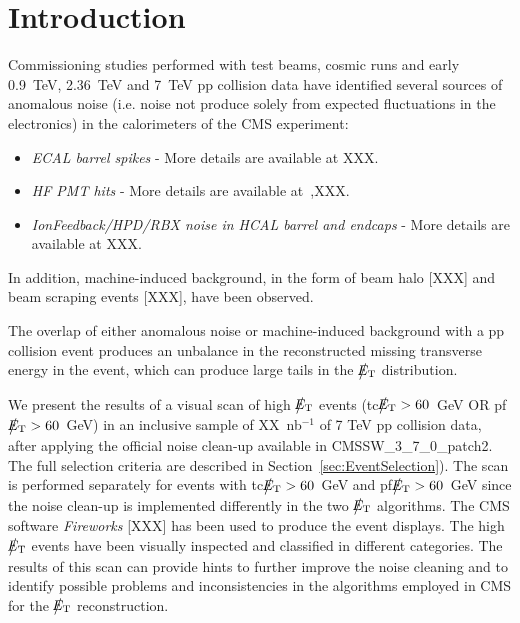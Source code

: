 \section{Introduction}

Commissioning studies performed with test beams, cosmic runs and 
early 0.9~TeV, 2.36~TeV and 7~TeV pp 
collision data have identified several sources of anomalous noise 
(i.e. noise not produce solely from expected fluctuations in the electronics)
in the calorimeters of the CMS experiment:
\begin{itemize}
\item {\it ECAL barrel spikes} - More details are available at XXX.

\item {\it HF PMT hits} - More details are available at~\cite{Chatrchyan:1225105},XXX.

\item {\it IonFeedback/HPD/RBX noise in HCAL barrel and endcaps} - More details are available at XXX.
\end{itemize}
In addition, machine-induced background, in the form of 
beam halo [XXX] and beam scraping events [XXX], have been observed. 

The overlap of either anomalous noise or machine-induced background 
with a pp collision event produces an unbalance in 
the reconstructed missing transverse energy in the event, which can produce 
large tails in the $\big\slash\hspace{-1.6ex}{E_\text{T}}$ distribution. 

We present the results of a visual scan of high $\big\slash\hspace{-1.6ex}{E_\text{T}}$ events 
(tc$\big\slash\hspace{-1.6ex}{E_\text{T}}>60$~GeV OR pf$\big\slash\hspace{-1.6ex}{E_\text{T}}>60$~GeV)
in an inclusive sample of XX~nb$^{-1}$ of 7 TeV pp collision data, 
after applying the official noise clean-up available in CMSSW\_3\_7\_0\_patch2.
The full selection criteria are described in Section~\ref{sec:EventSelection}). 
The scan is performed separately for events with tc$\big\slash\hspace{-1.6ex}{E_\text{T}}>60$~GeV and pf$\big\slash\hspace{-1.6ex}{E_\text{T}}>60$~GeV
since the noise clean-up is implemented differently in the two $\big\slash\hspace{-1.6ex}{E_\text{T}}$ algorithms.
The CMS software {\it Fireworks} [XXX] has been used to produce the event displays. 
The high $\big\slash\hspace{-1.6ex}{E_\text{T}}$ events have been visually inspected and classified in different 
categories. The results of this scan can provide hints to further improve the noise 
cleaning and to identify possible problems and inconsistencies in the algorithms employed 
in CMS for the $\big\slash\hspace{-1.6ex}{E_\text{T}}$ reconstruction.

